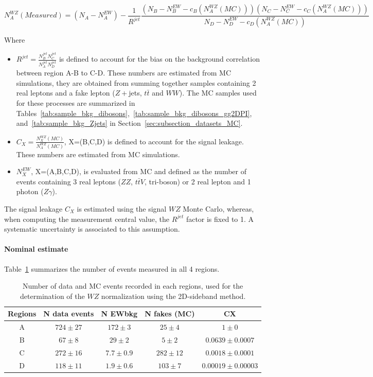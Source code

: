 \begin{equation}
N_A^{WZ}(Measured)=(N_A-N_A^{EW})-\frac{1}{R^{jet}} \frac{(N_B-N_B^{EW}-c_B (N_A^{WZ}(MC))) (N_C-N_C^{EW}-c_C (N_A^{WZ}(MC)))}{N_D-N_D^{EW}-c_D (N_A^{WZ}(MC))}
\label{Equ:NWjet1}
\end{equation}

Where 
\begin{itemize}
\item $R^{jet}=\frac{N^{jet}_B N^{jet}_C}{N^{jet}_A
  N^{jet}_D}$ is defined to account for the bias on the background correlation between region A-B to C-D. These numbers are estimated from MC simulations, they are obtained from summing together samples containing 2 real leptons and a fake lepton ($Z+$jets, $t\bar{t}$ and $WW$). The MC samples used for these processes are summarized in Tables~\ref{tab:sample_bkg_dibosons},~\ref{tab:sample_bkg_dibosons_gg2DPI}, and~\ref{tab:sample_bkg_Zjets} in Section~\ref{sec:subsection_datasets_MC}.
\item $C_X=\frac{N_X^{WZ}(MC)}{N_A^{WZ}(MC)}$, X=(B,C,D) is defined to account for the signal leakage. These numbers are estimated from MC simulations.
\item $N_X^{EW}$, X=(A,B,C,D), is evaluated from MC and defined as the number of events containing 3 real leptons ($ZZ$, $t\bar{t}V$, tri-boson) or 2 real lepton and 1 photon ($Z\gamma$).
\end{itemize}
The signal leakage $C_X$ is estimated using the signal $WZ$ Monte Carlo, whereas, when computing the measurement central value, the $R^{jet}$ factor is fixed to 1. A systematic uncertainty is associated to this assumption. 

\paragraph{Nominal estimate}


Table~\ref{tab:WZ_Nominal_Numbers} summarizes the number of events measured in all 4 regions.

\begin{table}[htp]
\centering
\begin{tabular}{c|cccc}
  \hline
  Regions & N data events & N EWbkg      & N fakes (MC)    & CX \\
  \hline
	    A & $724 \pm 27$ & $172 \pm 3$   & $25 \pm 4$ & $1 \pm 0$ \\ 
	    B & $67 \pm 8$   & $29 \pm  2$   & $5 \pm 2$ & $0.0639 \pm 0.0007$ \\ 
	    C & $272 \pm 16$ & $7.7 \pm 0.9$ & $282 \pm 12$ & $0.0018 \pm 0.0001$ \\ 
	    D & $118 \pm 11$ & $1.9 \pm 0.6$ & $103 \pm 7$ & $0.00019 \pm 0.00003$ \\ 
  \hline
\end{tabular}
\caption{Number of data and MC events recorded in each regions, used for the determination of the $WZ$ normalization using the 2D-sideband method.}
\label{tab:WZ_Nominal_Numbers}
\end{table}

